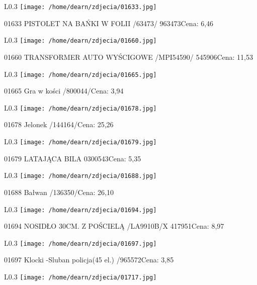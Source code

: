 \begin{wrapfigure}{L}{0.3\textwidth}
\texttt{[image: /home/dearn/zdjecia/01633.jpg]}
\end{wrapfigure}
01633 PISTOLET NA BAŃKI W FOLII /63473/               963473Cena: 6,46\newline
\begin{wrapfigure}{L}{0.3\textwidth}
\texttt{[image: /home/dearn/zdjecia/01660.jpg]}
\end{wrapfigure}
01660 TRANSFORMER AUTO WYŚCIGOWE /MPI54590/           545906Cena: 11,53\newline
\begin{wrapfigure}{L}{0.3\textwidth}
\texttt{[image: /home/dearn/zdjecia/01665.jpg]}
\end{wrapfigure}
01665 Gra w kości /800044/Cena: 3,94\newline
\begin{wrapfigure}{L}{0.3\textwidth}
\texttt{[image: /home/dearn/zdjecia/01678.jpg]}
\end{wrapfigure}
01678 Jelonek /144164/Cena: 25,26\newline
\begin{wrapfigure}{L}{0.3\textwidth}
\texttt{[image: /home/dearn/zdjecia/01679.jpg]}
\end{wrapfigure}
01679 LATAJĄCA BILA 0300543Cena: 5,35\newline
\begin{wrapfigure}{L}{0.3\textwidth}
\texttt{[image: /home/dearn/zdjecia/01688.jpg]}
\end{wrapfigure}
01688 Bałwan /136350/Cena: 26,10\newline
\begin{wrapfigure}{L}{0.3\textwidth}
\texttt{[image: /home/dearn/zdjecia/01694.jpg]}
\end{wrapfigure}
01694 NOSIDŁO 30CM. Z POŚCIELĄ /LA9910B/X             417951Cena: 8,97\newline
\begin{wrapfigure}{L}{0.3\textwidth}
\texttt{[image: /home/dearn/zdjecia/01697.jpg]}
\end{wrapfigure}
01697 Klocki -Sluban policja(45 el.) /965572Cena: 3,85\newline
\begin{wrapfigure}{L}{0.3\textwidth}
\texttt{[image: /home/dearn/zdjecia/01717.jpg]}
\end{wrapfigure}
